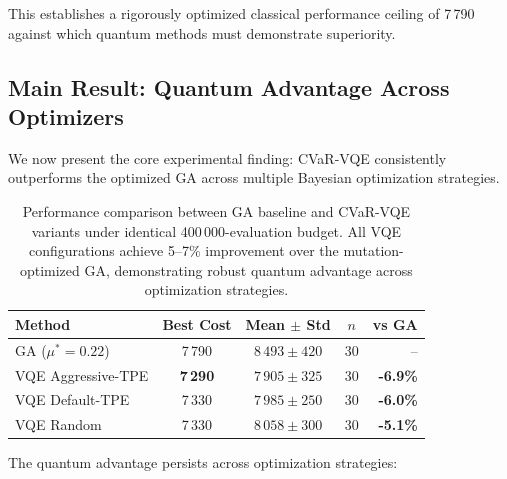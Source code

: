 This establishes a rigorously optimized classical performance ceiling of 7\,790 against which quantum methods must demonstrate superiority.

\subsection{Main Result: Quantum Advantage Across Optimizers}

We now present the core experimental finding: CVaR-VQE consistently outperforms the optimized GA across multiple Bayesian optimization strategies.


\begin{table}[htb]
    \centering
    \caption{Performance comparison between GA baseline and CVaR-VQE variants under identical 400\,000-evaluation budget. All VQE configurations achieve 5--7\% improvement over the mutation-optimized GA, demonstrating robust quantum advantage across optimization strategies.}
    \label{tab:main_results}
    \begin{tabular}{lcccr}
        \toprule
        Method & Best Cost & Mean $\pm$ Std & $n$ & vs GA \\
        \midrule
        GA ($\mu^* = 0.22$) & 7\,790 & $8\,493 \pm 420$ & 30 & -- \\
        VQE Aggressive-TPE & \textbf{7\,290} & $7\,905 \pm 325$ & 30 & \textbf{-6.9\%} \\
        VQE Default-TPE & 7\,330 & $7\,985 \pm 250$ & 30 & \textbf{-6.0\%} \\
        VQE Random & 7\,330 & $8\,058 \pm 300$ & 30 & \textbf{-5.1\%} \\
        \bottomrule
    \end{tabular}
\end{table}

The quantum advantage persists across optimization strategies:

